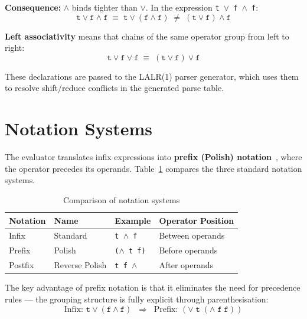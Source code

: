\textbf{Consequence:} $\wedge$ binds tighter than $\vee$. In the expression \texttt{t $\vee$ f $\wedge$ f}:
\begin{equation}
\texttt{t} \vee \texttt{f} \wedge \texttt{f} \;\equiv\; \texttt{t} \vee (\texttt{f} \wedge \texttt{f}) \;\neq\; (\texttt{t} \vee \texttt{f}) \wedge \texttt{f}
\end{equation}

\textbf{Left associativity} means that chains of the same operator group from left to right:
\begin{equation}
\texttt{t} \vee \texttt{f} \vee \texttt{f} \;\equiv\; (\texttt{t} \vee \texttt{f}) \vee \texttt{f}
\end{equation}

These declarations are passed to the LALR(1) parser generator, which uses them to resolve shift/reduce conflicts in the generated parse table.

\section{Notation Systems}

The evaluator translates infix expressions into \textbf{prefix (Polish) notation}~\citep{lukasiewicz1957}, where the operator precedes its operands. Table~\ref{table:notations} compares the three standard notation systems.

\begin{table}[H]
\centering
\caption{Comparison of notation systems}
\label{table:notations}
\begin{tabular}{@{}llll@{}}
\toprule
Notation & Name & Example & Operator Position \\
\midrule
Infix   & Standard        & \texttt{t $\wedge$ f} & Between operands \\
Prefix  & Polish          & \texttt{($\wedge$ t f)} & Before operands \\
Postfix & Reverse Polish  & \texttt{t f $\wedge$}   & After operands \\
\bottomrule
\end{tabular}
\end{table}

The key advantage of prefix notation is that it eliminates the need for precedence rules --- the grouping structure is fully explicit through parenthesisation:
\begin{equation}
\text{Infix: } \texttt{t} \vee (\texttt{f} \wedge \texttt{f}) \;\;\Longrightarrow\;\; \text{Prefix: } (\vee\; \texttt{t}\; (\wedge\; \texttt{f}\; \texttt{f}))
\end{equation}
